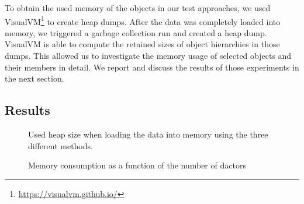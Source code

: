   To obtain the used memory of the objects in our test approaches, we used VisualVM\footnote{\url{https://visualvm.github.io/}} to create heap dumps.
  After the data was completely loaded into memory, we triggered a garbage collection run and created a heap dump.
  VisualVM is able to compute the retained sizes of object hierarchies in those dumps.
  This allowed us to investigate the memory usage of selected objects and their members in detail.
  We report and discuss the results of those experiments in the next section.

\subsection{Results}

  \begin{figure}
    \centering
    \caption{Used heap size when loading the data into memory using the three different methods.}
    \label{fig:exp:general}
  \end{figure}

  \begin{figure}
    \centering
    \caption{Memory consumption as a function of the number of \glspl{dactor}}
    \label{fig:exp:dactors}
  \end{figure}


